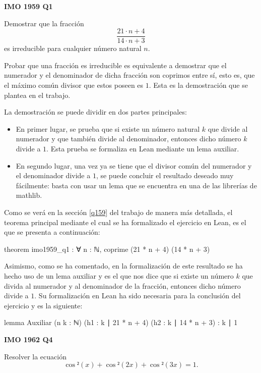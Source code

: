 \textbf{IMO 1959 Q1}

\noindent
Demostrar que la fracción
\[\frac{21⋅n+4}{14⋅n+3}\]
es irreducible para cualquier número natural \(n\).

Probar que una fracción es irreducible es equivalente a demostrar que el
numerador y el denominador de dicha fracción son coprimos entre sí, esto
es, que el máximo común divisor que estos poseen es \(1\). Esta es la
demostración que se plantea en el trabajo.

La demostración se puede dividir en dos partes principales:
\begin{itemize}
\item En primer lugar, se prueba que si existe un número natural \(k\)
  que divide al numerador y que también divide al denominador, entonces
  dicho número \(k\) divide a \(1\). Esta prueba se formaliza en Lean
  mediante un lema auxiliar.

\item En segundo lugar, una vez ya se tiene que el divisor común del
  numerador y el denominador divide a \(1\), se puede concluir el
  resultado deseado muy fácilmente: basta con usar un lema que se
  encuentra en una de las librerías de mathlib.
\end{itemize}

Como se verá en la sección \ref{q159} del trabajo de manera más
detallada, el teorema principal mediante el cual se ha formalizado el
ejercicio en Lean, es el que se presenta a continuación:
\begin{leancode}
theorem imo1959_q1 : ∀ n : ℕ, coprime (21 * n + 4) (14 * n + 3)
\end{leancode}

Asimismo, como se ha comentado, en la formalización de este resultado se
ha hecho uso de un lema auxiliar y es el que nos dice que si existe un
número \(k\) que divida al numerador y al denominador de la fracción,
entonces dicho número divide a \(1\). Su formalización en Lean ha sido
necesaria para la conclusión del ejercicio y es la siguiente:
\begin{leancode}
lemma Auxiliar
  (n k : ℕ)
  (h1 : k ∣ 21 * n + 4)
  (h2 : k ∣ 14 * n + 3)
  : k ∣ 1
\end{leancode}

\textbf{IMO 1962 Q4}

\noindent
Resolver la ecuación
\begin{equation}\label{ecuacionq4}
  \cos²(x)+\cos²(2x)+\cos²(3x)=1.
\end{equation}

